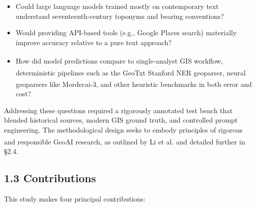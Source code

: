 \documentclass[
  10pt]{article}
\providecommand{\tightlist}{%
  \setlength{\itemsep}{0pt}\setlength{\parskip}{0pt}}
\begin{document}
\begin{itemize}
\tightlist
\item
  Could large language models trained mostly on contemporary text
  understand seventeenth-century toponyms and bearing conventions?
\item
  Would providing API-based tools (e.g., Google Places search)
  materially improve accuracy relative to a pure text approach?
\item
  How did model predictions compare to single-analyst GIS
  workflow\textsuperscript{},
  deterministic pipelines such as the GeoTxt Stanford NER
  geoparser\textsuperscript{},
  neural geoparsers like
  Mordecai-3\textsuperscript{},
  and other heuristic benchmarks in both error and cost?
\end{itemize}

Addressing these questions required a rigorously annotated test bench
that blended historical sources, modern GIS ground truth, and controlled
prompt engineering. The methodological design seeks to embody principles
of rigorous and responsible GeoAI research, as outlined by Li et
al.\textsuperscript{} and detailed further
in §2.4.

\subsection{1.3 Contributions}\label{contributions}

This study makes four principal contributions:
\end{document}
